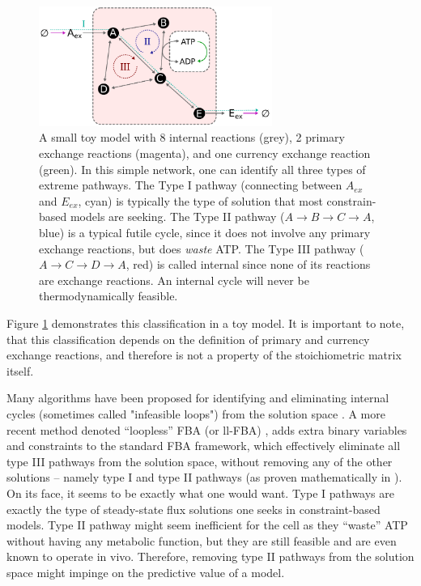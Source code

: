 \documentclass[twocolumn]{bmcart}%
\begin{document}
\begin{figure}[h!]
	\includegraphics[width=3in]{figure1.pdf}
	\caption{
		A small toy model with 8 internal reactions (grey), 2 primary exchange reactions (magenta), and one currency exchange reaction (green). In this simple network, one can identify all three types of extreme pathways. The Type I pathway (connecting between $A_{ex}$ and $E_{ex}$, cyan) is typically the type of solution that most constrain-based models are seeking. The Type II pathway ($A \rightarrow B \rightarrow C \rightarrow A$, blue) is a typical futile cycle, since it does not involve any primary exchange reactions, but does \emph{waste} ATP. The Type III pathway ($A \rightarrow C \rightarrow D \rightarrow A$, red) is called internal since none of its reactions are exchange reactions. An internal cycle will never be thermodynamically feasible.}
    \label{fig:cycles}
\end{figure}
Figure \ref{fig:cycles} demonstrates this classification in a toy model. It is important to note, that this classification depends on the definition of primary and currency exchange reactions, and therefore is not a property of the stoichiometric matrix itself.

Many algorithms have been proposed for identifying and eliminating internal cycles (sometimes called "infeasible loops") from the solution space \cite{Price2002-ef, Kummel2006-qn, Price2006-ua, Wright2008-rh}. A more recent method denoted ``loopless'' FBA (or ll-FBA) \cite{Schellenberger2011-bq}, adds extra binary variables and constraints to the standard FBA framework, which effectively eliminate all type III pathways from the solution space, without removing any of the other solutions -- namely type I and type II pathways (as proven mathematically in \cite{Noor2012-qb}).
On its face, it seems to be exactly what one would want. Type I pathways are exactly the type of steady-state flux solutions one seeks in constraint-based models. Type II pathway might seem inefficient for the cell as they ``waste'' ATP without having any metabolic function, but they are still feasible and are even known to operate in vivo. Therefore, removing type II pathways from the solution space might impinge on the predictive value of a model.
\end{document}
